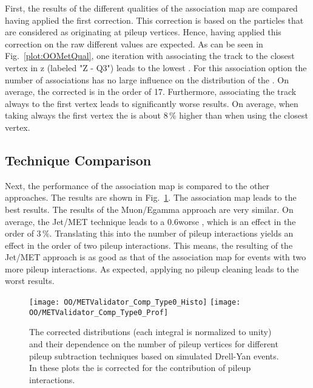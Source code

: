 First, the results of the different qualities of the association map are compared having applied the first \MET{} correction. This correction is based on the particles that are considered as originating at pileup vertices. Hence, having applied this correction on the raw \MET{} different values are expected. As can be seen in Fig.~\ref{plot:OOMetQual}, one iteration with associating the track to the closest vertex in z (labeled "Z - Q3") leads to the lowest \MET{}. For this association option the number of associations has no large influence on the distribution of the \MET{}. On average, the corrected \MET{} is in the order of 17\GeV{}. Furthermore, associating the track always to the first vertex leads to significantly worse results. On average, when taking always the first vertex the \MET{} is about $8\,\%$ higher than when using the closest vertex.


\subsection{Technique Comparison \label{sec:OOMetComp}}

Next, the performance of the association map is compared to the other approaches. The results are shown in Fig.~\ref{plot:OOMetComp}. The association map leads to the best results. The results of the Muon/Egamma approach are very similar. On average, the Jet/MET technique leads to a 0.6\GeV worse \MET{}, which is an effect in the order of $3\,\%$. Translating this into the number of pileup interactions yields an effect in the order of two pileup interactions. This means, the resulting \MET{} of the Jet/MET approach is as good as that of the association map for events with two more pileup interactions. As expected, applying no pileup cleaning leads to the worst results.

\begin{figure}[Ht]
  \centering
  \texttt{[image: OO/METValidator\_Comp\_Type0\_Histo]}
  \texttt{[image: OO/METValidator\_Comp\_Type0\_Prof]}
  \caption[The corrected \MET{} distribution and its dependence on the number of pileup vertices for different pileup subtraction techniques based on simulated Drell-Yan events]{The corrected \MET{} distributions (each integral is normalized to unity) and their dependence on the number of pileup vertices for different pileup subtraction techniques based on simulated Drell-Yan events. In these plots the \MET{} is corrected for the contribution of pileup interactions. \label{plot:OOMetComp}}
\end{figure}

